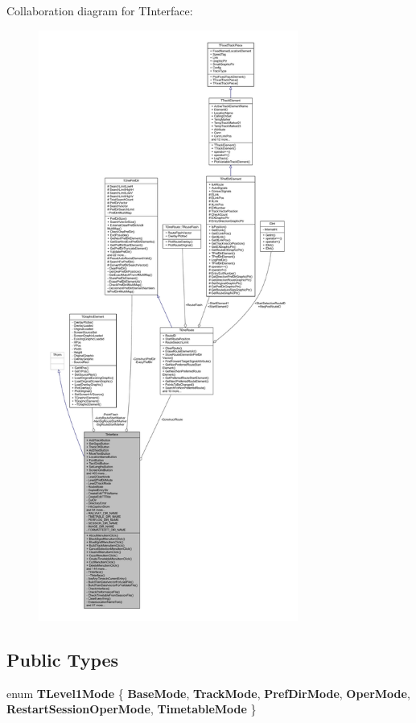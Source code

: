 Collaboration diagram for T\+Interface\+:\nopagebreak
\begin{figure}[H]
\begin{center}
\leavevmode
\includegraphics[height=550pt]{class_t_interface__coll__graph}
\end{center}
\end{figure}
\subsection*{Public Types}
\begin{DoxyCompactItemize}
\item 
\mbox{\label{class_t_interface_afdd8ad9ea5529b9193c4b4c5ac683bc5}} 
enum {\bfseries T\+Level1\+Mode} \{ \newline
{\bfseries Base\+Mode}, 
{\bfseries Track\+Mode}, 
{\bfseries Pref\+Dir\+Mode}, 
{\bfseries Oper\+Mode}, 
\newline
{\bfseries Restart\+Session\+Oper\+Mode}, 
{\bfseries Timetable\+Mode}
 \}
\end{DoxyCompactItemize}
